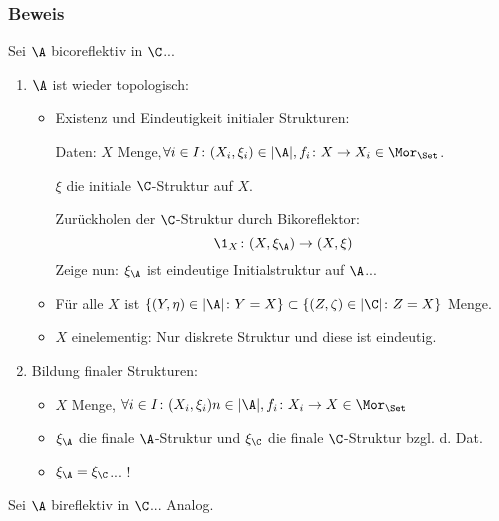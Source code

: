 \begin{frame}
\frametitle{Beweis}
Sei $\A$ bicoreflektiv in $\C$...
\pause
\begin{enumerate}[(1)]
\item<+-> $\A$ ist wieder topologisch:
\begin{itemize}
  \item<+-> Existenz und Eindeutigkeit initialer Strukturen:

  Daten: $X$ Menge,$\forall i \in I \colon (X_i, \xi_i) \in |\A|, f_i \colon X \to X_i \in \Mor_\Set$. 

  $\xi$ die initiale $\C$-Struktur auf $X$. 

  Zurückholen der $\C$-Struktur durch Bikoreflektor:
$$
\1_X \colon (X, \xi_\A) \to (X, \xi) 
$$
Zeige nun: $\xi_\A$ ist eindeutige Initialstruktur auf $\A$...

\item<+-> Für alle $X$ ist $\{(Y, \eta) \in |\A| \colon Y = X \} \subset\{(Z, \zeta) \in |\C| \colon Z = X \}$ Menge.

\item<+-> $X$ einelementig: Nur diskrete Struktur und diese ist eindeutig.
\end{itemize}

\item<+-> Bildung finaler Strukturen:
\begin{itemize}
\item<+-> $X$ Menge, $\forall i \in I \colon (X_i, \xi_i)n \in |\A|, f_i \colon X_i \to X \in \Mor_\Set$
\item<+-> $\xi_\A$ die finale $\A$-Struktur und $\xi_\C$ die finale $\C$-Struktur bzgl. d. Dat.
\item<+-> $\xi_\A = \xi_\C$... \pause !
\end{itemize}

\end{enumerate}

\pause
\vspace{2em}
Sei $\A$ bireflektiv in $\C$... Analog.

\end{frame}
